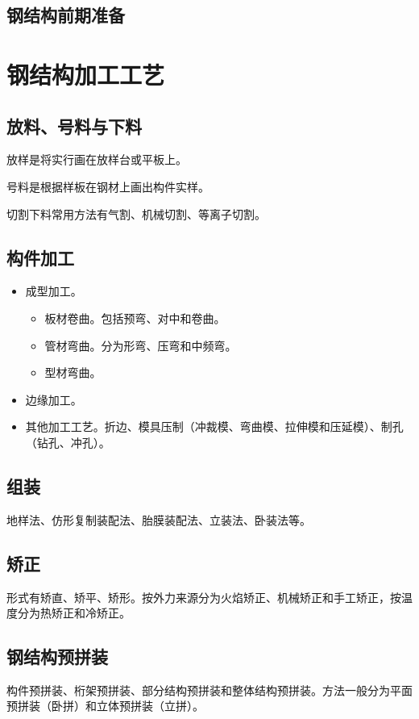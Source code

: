 \documentclass{book}
\begin{document}
\subsection{钢结构前期准备}
\section{钢结构加工工艺}
\subsection{放料、号料与下料}
\par 放样是将实行画在放样台或平板上。
\par 号料是根据样板在钢材上画出构件实样。
\par 切割下料常用方法有气割、机械切割、等离子切割。
\subsection{构件加工}
\begin{itemize}
    \item 成型加工。
          \begin{itemize}
              \item 板材卷曲。包括预弯、对中和卷曲。
              \item 管材弯曲。分为形弯、压弯和中频弯。
              \item 型材弯曲。
          \end{itemize}
    \item 边缘加工。
    \item 其他加工工艺。折边、模具压制（冲裁模、弯曲模、拉伸模和压延模）、制孔（钻孔、冲孔）。
\end{itemize}
\subsection{组装}
\par 地样法、仿形复制装配法、胎膜装配法、立装法、卧装法等。
\subsection{矫正}
\par 形式有矫直、矫平、矫形。按外力来源分为火焰矫正、机械矫正和手工矫正，按温度分为热矫正和冷矫正。
\subsection{钢结构预拼装}
\par 构件预拼装、桁架预拼装、部分结构预拼装和整体结构预拼装。方法一般分为平面预拼装（卧拼）和立体预拼装（立拼）。
\end{document}
